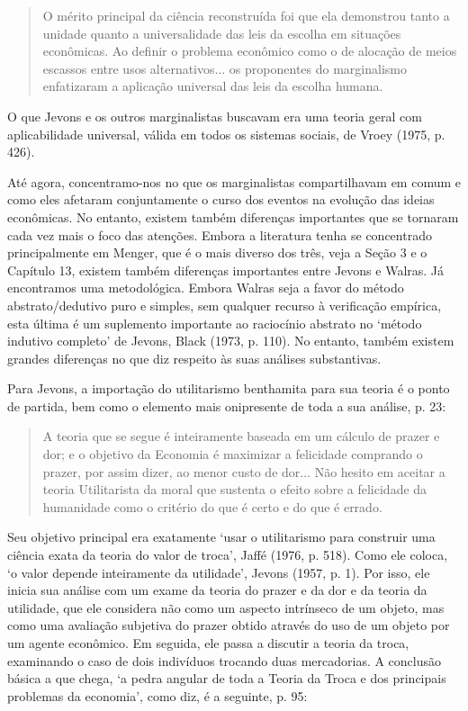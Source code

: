 \documentclass[12pt]{article}
\begin{document}
\begin{quote}
O mérito principal da ciência reconstruída foi que ela demonstrou tanto a unidade quanto a universalidade das leis da escolha em situações econômicas. Ao definir o problema econômico como o de alocação de meios escassos entre usos alternativos... os proponentes do marginalismo enfatizaram a aplicação universal das leis da escolha humana.
\end{quote}

O que Jevons e os outros marginalistas buscavam era uma teoria geral com aplicabilidade universal, válida em todos os sistemas sociais, de Vroey (1975, p. 426).

Até agora, concentramo-nos no que os marginalistas compartilhavam em comum e como eles afetaram conjuntamente o curso dos eventos na evolução das ideias econômicas. No entanto, existem também diferenças importantes que se tornaram cada vez mais o foco das atenções. Embora a literatura tenha se concentrado principalmente em Menger, que é o mais diverso dos três, veja a Seção 3 e o Capítulo 13, existem também diferenças importantes entre Jevons e Walras. Já encontramos uma metodológica. Embora Walras seja a favor do método abstrato/dedutivo puro e simples, sem qualquer recurso à verificação empírica, esta última é um suplemento importante ao raciocínio abstrato no ‘método indutivo completo’ de Jevons, Black (1973, p. 110). No entanto, também existem grandes diferenças no que diz respeito às suas análises substantivas.

Para Jevons, a importação do utilitarismo benthamita para sua teoria é o ponto de partida, bem como o elemento mais onipresente de toda a sua análise, p. 23:

\begin{quote}
A teoria que se segue é inteiramente baseada em um cálculo de prazer e dor; e o objetivo da Economia é maximizar a felicidade comprando o prazer, por assim dizer, ao menor custo de dor... Não hesito em aceitar a teoria Utilitarista da moral que sustenta o efeito sobre a felicidade da humanidade como o critério do que é certo e do que é errado.
\end{quote}

Seu objetivo principal era exatamente ‘usar o utilitarismo para construir uma ciência exata da teoria do valor de troca’, Jaffé (1976, p. 518). Como ele coloca, ‘o valor depende inteiramente da utilidade’, Jevons (1957, p. 1). Por isso, ele inicia sua análise com um exame da teoria do prazer e da dor e da teoria da utilidade, que ele considera não como um aspecto intrínseco de um objeto, mas como uma avaliação subjetiva do prazer obtido através do uso de um objeto por um agente econômico. Em seguida, ele passa a discutir a teoria da troca, examinando o caso de dois indivíduos trocando duas mercadorias. A conclusão básica a que chega, ‘a pedra angular de toda a Teoria da Troca e dos principais problemas da economia’, como diz, é a seguinte, p. 95:
\end{document}
